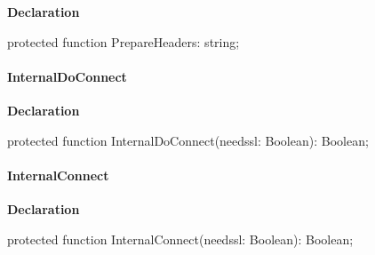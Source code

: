 \documentclass{report}
\newif\ifpdf
\begin{document}
\label{httpsend.THTTPSend-PrepareHeaders}
\begin{list}{}{
\setlength{\itemindent}{0cm}
\setlength{\listparindent}{0cm}
\setlength{\leftmargin}{\evensidemargin}
\addtolength{\leftmargin}{\tmplength}
\settowidth{\labelsep}{X}
\addtolength{\leftmargin}{\labelsep}
\setlength{\labelwidth}{\tmplength}
}
\item[\textbf{Declaration}\hfill]
\ifpdf
\begin{flushleft}
\fi
\begin{ttfamily}
protected function PrepareHeaders: string;\end{ttfamily}

\ifpdf
\end{flushleft}
\fi

\end{list}
\paragraph*{InternalDoConnect}\hspace*{\fill}

\label{httpsend.THTTPSend-InternalDoConnect}
\begin{list}{}{
\setlength{\itemindent}{0cm}
\setlength{\listparindent}{0cm}
\setlength{\leftmargin}{\evensidemargin}
\addtolength{\leftmargin}{\tmplength}
\settowidth{\labelsep}{X}
\addtolength{\leftmargin}{\labelsep}
\setlength{\labelwidth}{\tmplength}
}
\item[\textbf{Declaration}\hfill]
\ifpdf
\begin{flushleft}
\fi
\begin{ttfamily}
protected function InternalDoConnect(needssl: Boolean): Boolean;\end{ttfamily}

\ifpdf
\end{flushleft}
\fi

\end{list}
\paragraph*{InternalConnect}\hspace*{\fill}

\label{httpsend.THTTPSend-InternalConnect}
\begin{list}{}{
\setlength{\itemindent}{0cm}
\setlength{\listparindent}{0cm}
\setlength{\leftmargin}{\evensidemargin}
\addtolength{\leftmargin}{\tmplength}
\settowidth{\labelsep}{X}
\addtolength{\leftmargin}{\labelsep}
\setlength{\labelwidth}{\tmplength}
}
\item[\textbf{Declaration}\hfill]
\ifpdf
\begin{flushleft}
\fi
\begin{ttfamily}
protected function InternalConnect(needssl: Boolean): Boolean;\end{ttfamily}

\ifpdf
\end{flushleft}
\fi

\end{list}
\end{document}
